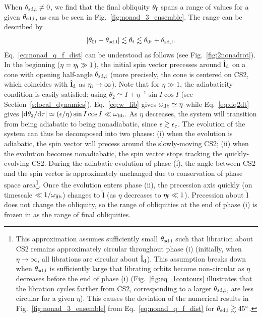 \documentclass[twocolumn,twocolappendix]{aastex63}
\newcommand*{\rdil}[2]{\mathrm{d}#1 / \mathrm{d}#2}
\newcommand*{\abs}[1]{\left|#1\right|}
\newcommand*{\bsmb}[1]{\boldsymbol{\mathbf{#1}}}
\newcommand*{\uv}[1]{\hat{\bsmb{#1}}}
\newcommand*{\p}[1]{\left(#1\right)}
\begin{document}
When $\theta_{\rm sd, i}\neq 0$, we find that the final obliquity $\theta_{\rm
f}$ spans a range of values for a given $\theta_{\rm sd, i}$, as can be
seen in Fig.~\ref{fig:nonad_3_ensemble}. The range can be described by
\begin{equation}
    \abs{\theta_{\rm 0f} - \theta_{\rm sd, i}}
        \lesssim \theta_{\rm f}
        \lesssim \theta_{\rm 0f} + \theta_{\rm sd, i}
    .\label{eq:nonad_q_f_dist}
\end{equation}
Eq.~\eqref{eq:nonad_q_f_dist} can be understood as follows (see
Fig.~\ref{fig:2nonadrot}). In the beginning ($\eta = \eta_{\rm i} \gg 1$), the
initial spin vector precesses around $\uv{l}_{\rm d}$ on a cone with opening
half-angle $\theta_{\rm sd, i}$ (more precisely, the cone is centered on CS2,
which coincides with $\uv{l}_{\rm d}$ as $\eta_{\rm i} \to \infty$). Note that
for $\eta \gg 1$, the adiabaticity condition is easily satisfied: using
$\theta_2 \simeq I + \eta^{-1}\sin I \cos I$ (see
Section~\ref{s:local_dynamics}), Eq.~\eqref{eq:w_lib} gives $\omega_{\rm lib}
\simeq \eta$ while Eq.~\eqref{eq:dq2dt} gives $\abs{\rdil{\theta_2}{\tau}}
\simeq \p{\epsilon / \eta} \sin I \cos I \ll \omega_{\rm lib}$. As $\eta$
decreases, the system will transition from being adiabatic to being
nonadiabatic, since $\epsilon \gtrsim \epsilon_{\rm c}$. The evolution of the
system can thus be decomposed into two phases: (i) when the evolution is
adiabatic, the spin vector will precess around the slowly-moving CS2; (ii) when
the evolution becomes nonadiabatic, the spin vector stops tracking the
quickly-evolving CS2. During the adiabatic evolution of phase (i), the angle
between CS2 and the spin vector is approximately unchanged due to conservation
of phase space area\footnote{ This approximation assumes sufficiently small
$\theta_{\rm sd, i}$ such that libration about CS2 remains approximately
circular throughout phase (i) (initially, when $\eta \to \infty$, all librations
are circular about $\uv{l}_{\rm d}$). This assumption breaks down when
$\theta_{\rm sd, i}$ is sufficiently large that librating orbits become
non-circular as $\eta$ decreases before the end of phase (i)
(Fig.~\ref{fig:eq_1contours} illustrates that the libration cycles farther from
CS2, corresponding to a larger $\theta_{\rm sd, i}$, are less circular for a
given $\eta$).
This causes the deviation of the numerical results in
Fig.~\ref{fig:nonad_3_ensemble} from Eq.~\eqref{eq:nonad_q_f_dist} for
$\theta_{\rm sd, i} \gtrsim 45^\circ$. }.
Once the evolution enters phase (ii), the precession axis
quickly (on timescale $\ll 1 / \omega_{\rm lib}$) changes to $\uv{l}$ (as $\eta$
decreases to $\eta_{\rm f} \ll 1$). Precession about $\uv{l}$ does not change the
obliquity, so the range of obliquities at the end of phase (i) is frozen in as
the range of final obliquities.
\end{document}
